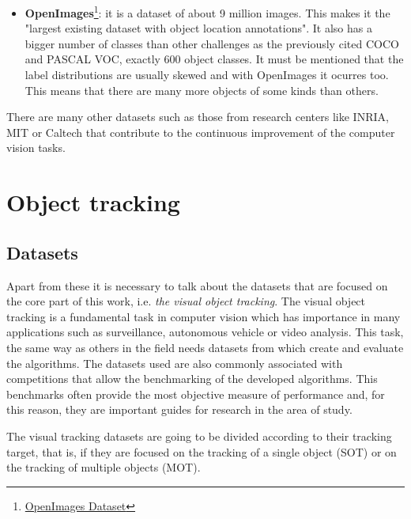 \begin{itemize}
\item \textbf{OpenImages}\footnote {\href{https://storage.googleapis.com/openimages/web/index.html}{OpenImages Dataset}}: it is a dataset of about 9 million images. This makes it the "largest existing dataset with object location annotations". It also has a bigger number of classes than other challenges as the previously cited COCO and PASCAL VOC, exactly 600 object classes. It must be mentioned that the label distributions are usually skewed and with OpenImages it ocurres too. This means that there are many more objects of some kinds than others.
\end{itemize}
There are many other datasets such as those from research centers like INRIA, MIT or Caltech that contribute to the continuous improvement of the computer vision tasks.
\section{Object tracking}
\subsection{Datasets}
Apart from these it is necessary to talk about the datasets that are focused on the core part of this work, i.e. \textit{the visual object tracking}. The visual object tracking is a fundamental task in computer vision which has importance in many applications such as surveillance, autonomous vehicle or video analysis. This task, the same way as others in the field needs datasets from which create and evaluate the algorithms. The datasets used are also commonly associated with competitions that allow the benchmarking of the developed algorithms. This benchmarks often provide the most objective measure of performance and, for this reason, they are important guides for research in the area of study.

The visual tracking datasets are going to be divided according to their tracking target, that is, if they are focused on the tracking of a single object (SOT) or on the tracking of multiple objects (MOT).

